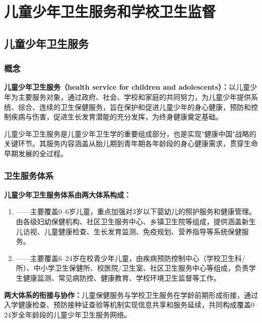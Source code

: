 \chapter{儿童少年卫生服务和学校卫生监督}
\setcounter{chapter}{12}

\section{儿童少年卫生服务}

\subsection{概念}

\begin{defbox}
\textbf{儿童少年卫生服务（health service for children and adolescents）：}以儿童少年为主要服务对象，通过政府、社会、学校和家庭的共同努力，为儿童少年提供系统、综合、连续的卫生保健服务，旨在保护和促进儿童少年的身心健康，预防和控制疾病与伤害，促进生长发育潜能的充分发挥，为终身健康奠定基础。

儿童少年卫生服务是儿童少年卫生学的重要组成部分，也是实现"健康中国"战略的关键环节。其服务内容涵盖从胎儿期到青年期各年龄段的身心健康需求，贯穿生命早期发展的全过程。
\end{defbox}

\subsection{卫生服务体系}

\begin{keybox}
\textbf{儿童少年卫生服务体系由两大体系构成：}

\begin{enumerate}[leftmargin=*]
    \item {}——主要覆盖0--6岁儿童，重点加强对3岁以下婴幼儿的照护服务和健康管理。由各级妇幼保健机构、社区卫生服务中心、乡镇卫生院等组成，提供涵盖新生儿访视、儿童健康检查、生长发育监测、免疫规划、营养指导等系统保健服务。

    \item {}——主要覆盖6--24岁在校青少年儿童，由疾病预防控制中心（学校卫生科/所）、中小学卫生保健所、校医院/卫生室、社区卫生服务中心等组成，负责学生健康监测、常见病防控、健康教育、学校环境卫生监督等工作。
\end{enumerate}

\textbf{两大体系的衔接与协作：}儿童保健服务与学校卫生服务在学龄前期形成衔接，通过入学健康检查、预防接种证查验等机制实现信息共享和服务延续，共同构成覆盖0--24岁全年龄段的儿童少年卫生服务网络。
\end{keybox}

